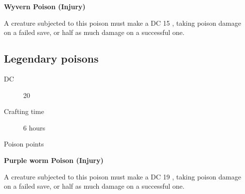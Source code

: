 \textbf{Wyvern Poison (Injury)}

A creature subjected to this poison must make a DC 15 \constitutionsave, taking  poison damage on a failed save, or half as much damage on a successful one.

\subsection{Legendary poisons}

\begin{description}
\item [DC] 20 \nature
\item [Crafting time] 6 hours
\item [Poison points] \poison\poison\poison\poison\poison\poison
\end{description}

\textbf{Purple worm Poison (Injury)}

A creature subjected to this poison must make a DC 19 \constitutionsave, taking  poison damage on a failed save, or half as much damage on a successful one.
